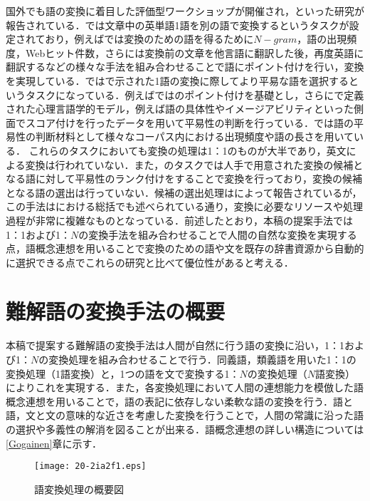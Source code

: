 \documentclass[japanese]{jnlp_1.4}
\begin{document}
国外でも語の変換に着目した評価型ワークショップ\cite{Article_22,Article_23}が開催され，\cite{Article_24,Article_25,Article_26}といった研究が報告されている．\cite{Article_22}では文章中の英単語1語を別の語で変換するというタスクが設定されており，例えば\cite{Article_24}では変換のための語を得るために$N-gram$，語の出現頻度，Webヒット件数，さらには変換前の文章を他言語に翻訳した後，再度英語に翻訳するなどの様々な手法を組み合わせることで語にポイント付けを行い，変換を実現している．\cite{Article_23}では\cite{Article_22}で示された1語の変換に際してより平易な語を選択するというタスクになっている．例えば\cite{Article_25}では\cite{Article_24}のポイント付けを基礎とし，さらに\cite{Article_27,Article_28}で定義された心理言語学的モデル，例えば語の具体性やイメージアビリティといった側面でスコア付けを行ったデータを用いて平易性の判断を行っている．\cite{Article_26}では語の平易性の判断材料として様々なコーパス内における出現頻度や語の長さを用いている．
これらのタスクにおいても変換の処理は1：1のものが大半であり，英文による変換は行われていない．また，\cite{Article_23}のタスクでは人手で用意された変換の候補となる語に対して平易性のランク付けをすることで変換を行っており，変換の候補となる語の選出は行っていない．候補の選出処理は\cite{Article_24}によって報告されているが，この手法は\cite{Article_22}における総括でも述べられている通り，変換に必要なリソースや処理過程が非常に複雑なものとなっている．前述したとおり，本稿の提案手法では1：1および1：$N$の変換手法を組み合わせることで人間の自然な変換を実現する点，語概念連想を用いることで変換のための語や文を既存の辞書資源から自動的に選択できる点でこれらの研究と比べて優位性があると考える．


\section{難解語の変換手法の概要}

本稿で提案する難解語の変換手法は人間が自然に行う語の変換に沿い，1：1および1：$N$の変換処理を組み合わせることで行う．同義語，類義語を用いた1：1の変換処理（1語変換）と，1つの語を文で変換する1：$N$の変換処理（$N$語変換）によりこれを実現する．また，各変換処理において人間の連想能力を模倣した語概念連想を用いることで，語の表記に依存しない柔軟な語の変換を行う．語と語，文と文の意味的な近さを考慮した変換を行うことで，人間の常識に沿った語の選択や多義性の解消を図ることが出来る．語概念連想の詳しい構造については\ref{Gogainen}章に示す．

\begin{figure}[b]
 \begin{center}
  \texttt{[image: 20-2ia2f1.eps]}
 \end{center}
 \caption{語変換処理の概要図}
 \label{fig:gaiyouzu}
\end{figure}
\end{document}
